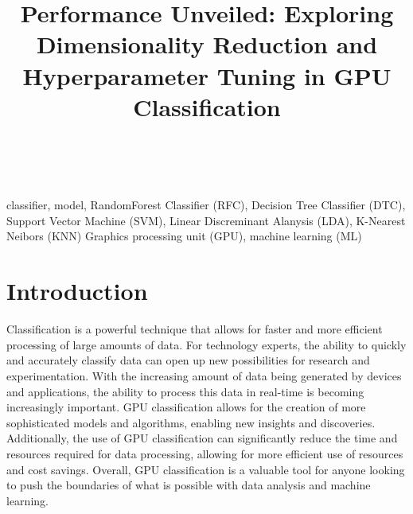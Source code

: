 \documentclass[conference,onecolumn]{IEEEtran}
\begin{document}
\title{Performance Unveiled: Exploring Dimensionality Reduction and Hyperparameter Tuning in GPU Classification}

\author{\\

}

\maketitle

\begin{abstract}

\end{abstract}

\begin{IEEEkeywords}
classifier, model, RandomForest Classifier (RFC), Decision Tree Classifier (DTC), Support Vector Machine (SVM), Linear Discreminant Alanysis (LDA), K-Nearest Neibors (KNN) Graphics processing unit (GPU), machine learning (ML)
\end{IEEEkeywords}

\newpage
\tableofcontents

\newpage
\section{Introduction}
\cite{C0}Classification is a powerful technique that allows for faster and more efficient processing of large amounts of data. For technology experts, the ability to quickly and accurately classify data can open up new possibilities for research and experimentation. With the increasing amount of data being generated by devices and applications, the ability to process this data in real-time is becoming increasingly important. GPU classification allows for the creation of more sophisticated models and algorithms, enabling new insights and discoveries. Additionally, the use of GPU classification can significantly reduce the time and resources required for data processing, allowing for more efficient use of resources and cost savings. Overall, GPU classification is a valuable tool for anyone looking to push the boundaries of what is possible with data analysis and machine learning.
\end{document}
